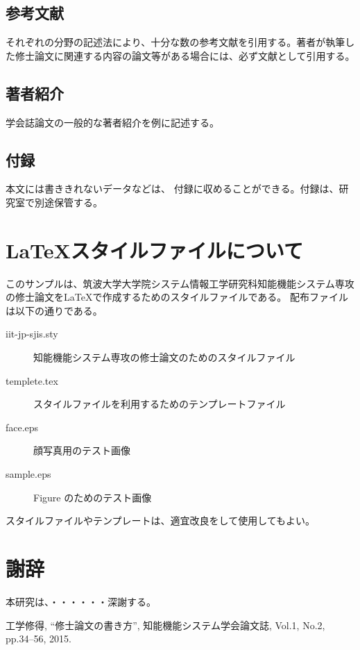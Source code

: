 \documentclass[11pt,twocolumn]{jarticle} %
\begin{document}
\subsection{参考文献}
それぞれの分野の記述法により、十分な数の参考文献を引用する\cite{osamu}。著者が執筆した修士論文に関連する内容の論文等がある場合には、必ず文献として引用する。

\subsection{著者紹介}
学会誌論文の一般的な著者紹介を例に記述する。

\subsection{付録}
本文には書ききれないデータなどは、
付録に収めることができる。付録は、研究室で別途保管する。



\section{\LaTeX スタイルファイルについて}
このサンプルは、筑波大学大学院システム情報工学研究科知能機能システム専攻の修士論文を\LaTeX で作成するためのスタイルファイルである。
配布ファイルは以下の通りである。
\begin{description}
 \item[iit-jp-sjis.sty]  知能機能システム専攻の修士論文のためのスタイルファイル
 \item[templete.tex] スタイルファイルを利用するためのテンプレートファイル
 \item[face.eps] 顔写真用のテスト画像
 \item[sample.eps] Figure のためのテスト画像
\end{description}

スタイルファイルやテンプレートは、適宜改良をして使用してもよい。

\section*{謝辞}
本研究は、・・・・・・深謝する。



\begin{thebibliography}{9}
  工学修得, ``修士論文の書き方'', 知能機能システム学会論文誌, Vol.1, No.2, pp.34--56, 2015.
\end{thebibliography}
\end{document}
